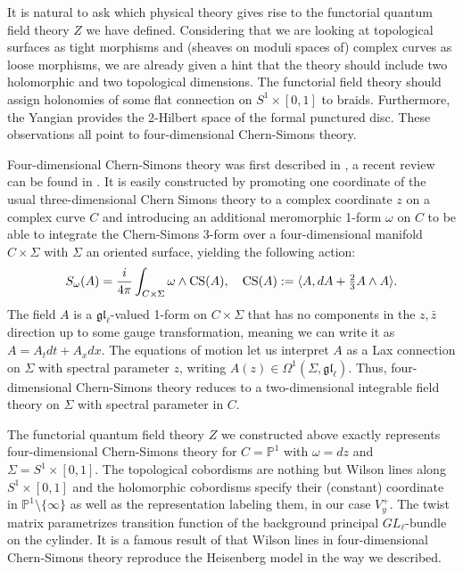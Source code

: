 \documentclass[11pt]{report}
\theoremstyle{definition}
\theoremstyle{remark}
\theoremstyle{remark}
\renewcommand{\P}{\mathbb{P}}
\begin{document}
It is natural to ask which physical theory gives rise to the functorial quantum field theory $Z$ we have defined. Considering that we are looking at topological surfaces as tight morphisms and (sheaves on moduli spaces of) complex curves as loose morphisms, we are already given a hint that the theory should include two holomorphic and two topological dimensions. The functorial field theory should assign holonomies of some flat connection on $S^1 \times [0,1]$ to braids. Furthermore, the Yangian provides the 2-Hilbert space of the formal punctured disc. These observations all point to four-dimensional Chern-Simons theory.

Four-dimensional Chern-Simons theory was first described in \cite{article:costello:2013}, a recent review can be found in \cite{article:lacroix:2022}. It is easily constructed by promoting one coordinate of the usual three-dimensional Chern Simons theory to a complex coordinate $z$ on a complex curve $C$ and introducing an additional meromorphic 1-form $\omega$ on $C$ to be able to integrate the Chern-Simons 3-form over a four-dimensional manifold $C \times \Sigma$ with $\Sigma$ an oriented surface, yielding the following action:
\begin{equation*}
S_\omega(A) = \frac{i}{4\pi} \int_{C \times \Sigma} \omega \wedge \textnormal{CS}(A), \quad \textnormal{CS}(A) := \langle A, dA + \tfrac 23 A \wedge A \rangle.
\end{equation*}
The field $A$ is a $\mathfrak{gl}_\ell$-valued 1-form on $C \times \Sigma$ that has no components in the $z,\bar z$ direction up to some gauge transformation, meaning we can write it as $A = A_t dt + A_x dx$. The equations of motion let us interpret $A$ as a Lax connection on $\Sigma$ with spectral parameter $z$, writing $A(z) \in \Omega^1(\Sigma,\mathfrak{gl}_\ell)$. Thus, four-dimensional Chern-Simons theory reduces to a two-dimensional integrable field theory on $\Sigma$ with spectral parameter in $C$.

The functorial quantum field theory $Z$ we constructed above exactly represents four-dimen\-sional Chern-Simons theory for $C=\P^1$ with $\omega = dz$ and $\Sigma = S^1 \times [0,1]$. The topological cobordisms are nothing but Wilson lines along $S^1 \times [0,1]$ and the holomorphic cobordisms specify their (constant) coordinate in $\P^1 \setminus \{ \infty \}$ as well as the representation labeling them, in our case $V_y^+$. The twist matrix parametrizes transition function of the background principal $GL_\ell$-bundle on the cylinder. It is a famous result of \cite{article:costello:2013} that Wilson lines in four-dimensional Chern-Simons theory reproduce the Heisenberg model in the way we described.
\end{document}
